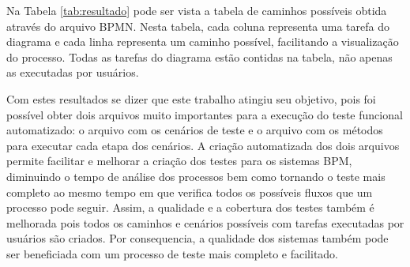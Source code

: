\documentclass[12pt]{article}
\begin{document}
Na Tabela \ref{tab:resultado} pode ser vista a tabela de caminhos possíveis obtida através do arquivo BPMN. Nesta tabela, cada coluna representa uma tarefa do diagrama e cada linha representa um caminho possível, facilitando a visualização do processo. Todas as tarefas do diagrama estão contidas na tabela, não apenas as executadas por usuários.

\begin{table}[]
\centering
\caption{Tabela obtida através do arquivo BPMN}
\label{tab:resultado}
\end{table}


Com estes resultados se dizer que este trabalho atingiu seu objetivo, pois foi possível obter dois arquivos muito importantes para a execução do teste funcional automatizado: o arquivo com os cenários de teste e o arquivo com os métodos para executar cada etapa dos cenários. A criação automatizada dos dois arquivos permite facilitar e melhorar a criação dos testes para os sistemas BPM, diminuindo o tempo de análise dos processos bem como tornando o teste mais completo ao mesmo tempo em que verifica todos os possíveis fluxos que um processo pode seguir. Assim, a qualidade e a cobertura dos testes também é melhorada pois todos os caminhos e cenários possíveis com tarefas executadas por usuários são criados. Por consequencia, a qualidade dos sistemas também pode ser beneficiada com um processo de teste mais completo e facilitado.
\end{document}
